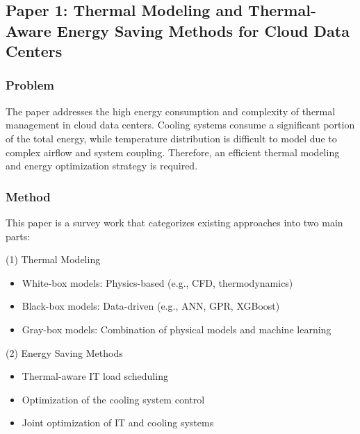 \documentclass[12pt,a4paper]{article}
\begin{document}
\subsection{Paper 1: Thermal Modeling and Thermal-Aware Energy Saving Methods for Cloud Data Centers}
    
        \subsubsection{\textbf{ Problem}}
        
                        The paper addresses the high energy consumption and complexity of thermal management in cloud data centers. Cooling systems consume a significant portion of the total energy, while temperature distribution is difficult to model due to complex airflow and system coupling. Therefore, an efficient thermal modeling and energy optimization strategy is required.

        \subsubsection{\textbf{Method}}

                        This paper is a survey work that categorizes existing approaches into two main parts:
    
         (1) Thermal Modeling
                     
                        \begin{itemize}
                        \item White-box models: Physics-based (e.g., CFD, thermodynamics)
                        \item Black-box models: Data-driven (e.g., ANN, GPR, XGBoost)
                        \item Gray-box models: Combination of physical models and machine learning
                        \end{itemize}
                    
                         
        (2) Energy Saving Methods
      
                        \begin{itemize}
                        \item Thermal-aware IT load scheduling
                        \item Optimization of the cooling system control
                        \item Joint optimization of IT and cooling systems
                        \end{itemize}
\end{document}

